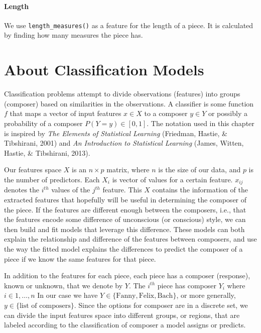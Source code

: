 \documentclass[12pt,twoside]{reedthesis}
\theoremstyle{definition}
\theoremstyle{definition}
\theoremstyle{definition}
\theoremstyle{remark}
\begin{document}
\subsubsection{Length}\label{length}

We use \texttt{length\_measures()} as a feature for the length of a
piece. It is calculated by finding how many measures the piece has.

\chapter{About Classification Models}\label{about-classification-models}

Classification problems attempt to divide observations (features) into
groups (composer) based on similarities in the observations. A
classifier is some function \(f\) that maps a vector of input features
\(x \in X\) to a composer \(y \in Y\) or possibly a probability of a
composer \(P(Y = y) \in [0,1]\). The notation used in this chapter is
inspired by \emph{The Elements of Statistical Learning} (Friedman,
Hastie, \& Tibshirani, 2001) and \emph{An Introduction to Statistical
Learning} (James, Witten, Hastie, \& Tibshirani, 2013).

Our features space \(X\) is an \(n \times p\) matrix, where \(n\) is the
size of our data, and \(p\) is the number of predictors. Each \(X_i\) is
vector of values for a certain feature. \(x_{ij}\) denotes the
\(i^{th}\) values of the \(j^{th}\) feature. This \(X\) contains the
information of the extracted features that hopefully will be useful in
determining the composer of the piece. If the features are different
enough between the composers, i.e., that the features encode some
difference of unconscious (or conscious) style, we can then build and
fit models that leverage this difference. These models can both explain
the relationship and difference of the features between composers, and
use the way the fitted model explains the differences to predict the
composer of a piece if we know the same features for that piece.

In addition to the features for each piece, each piece has a composer
(response), known or unknown, that we denote by \(Y\). The \(i^{th}\)
piece has composer \(Y_i\) where \(i \in 1, \ldots, n\) In our case we
have \(Y \in \{\text{Fanny},\text{Felix}, \text{Bach}\}\), or more
generally, \(y \in \{\text{list of composers}\}\). Since the options for
composer are in a discrete set, we can divide the input features space
into different groups, or regions, that are labeled according to the
classification of composer a model assigns or predicts.
\end{document}
